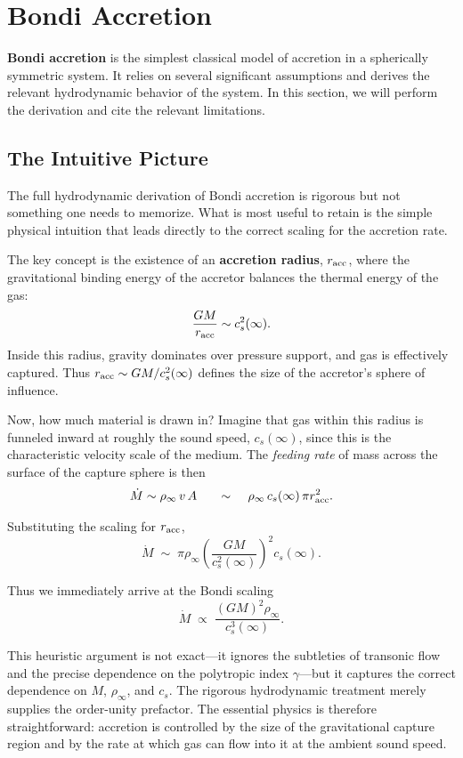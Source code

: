 \section{Bondi Accretion}

\textbf{Bondi accretion} is the simplest classical model of accretion in a spherically symmetric system. It relies on several significant assumptions and derives the relevant hydrodynamic behavior of the system. In this section, we will perform the derivation and cite the relevant limitations.

\subsection{The Intuitive Picture}

The full hydrodynamic derivation of Bondi accretion is rigorous but not something one
needs to memorize. What is most useful to retain is the simple physical intuition that
leads directly to the correct scaling for the accretion rate.

\par
The key concept is the existence of an \textbf{accretion radius}, $r_{\rm acc}$, where
the gravitational binding energy of the accretor balances the thermal energy of the gas:
\[
\frac{GM}{r_{\rm acc}} \sim c_s^2(\infty).
\]
Inside this radius, gravity dominates over pressure support, and gas is effectively
captured. Thus $r_{\rm acc} \sim GM/c_s^2(\infty)$ defines the size of the accretor's
sphere of influence.

\par
Now, how much material is drawn in? Imagine that gas within this radius is funneled
inward at roughly the sound speed, $c_s(\infty)$, since this is the characteristic
velocity scale of the medium. The \emph{feeding rate} of mass across the surface of
the capture sphere is then
\[
\dot{M} \sim \rho_\infty \, v \, A
\;\;\;\;\;\; \sim \;\;\;\; \rho_\infty \, c_s(\infty) \, \pi r_{\rm acc}^2.
\]

\par
Substituting the scaling for $r_{\rm acc}$,
\[
\dot{M} \;\sim\; \pi \rho_\infty \left(\frac{GM}{c_s^2(\infty)}\right)^2 c_s(\infty).
\]

\par
Thus we immediately arrive at the Bondi scaling
\[
\boxed{\dot{M} \;\propto\; \frac{(GM)^2 \rho_\infty}{c_s^3(\infty)}.}
\]

\par
This heuristic argument is not exact—it ignores the subtleties of transonic flow and
the precise dependence on the polytropic index $\gamma$—but it captures the correct
dependence on $M$, $\rho_\infty$, and $c_s$. The rigorous hydrodynamic treatment
merely supplies the order-unity prefactor. The essential physics is therefore
straightforward: accretion is controlled by the size of the gravitational capture
region and by the rate at which gas can flow into it at the ambient sound speed.

